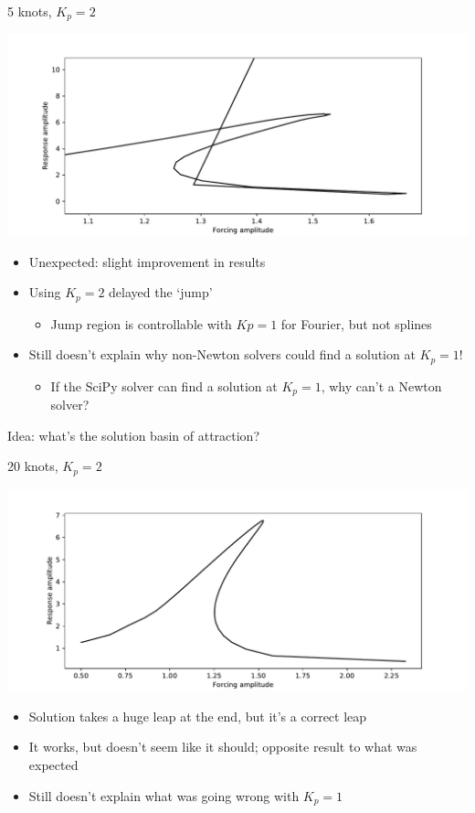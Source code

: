 \documentclass[presentation]{beamer}
\begin{document}
\begin{frame}[label={sec:org860db2f},plain]{5 knots, \(K_p = 2\)}
\begin{center}
\includegraphics[width=.9\linewidth]{./5_knots_cbc_kp_2.pdf}
\end{center}

\begin{itemize}
\item Unexpected: slight improvement in results
\item Using \(K_p = 2\) delayed the `jump'
\begin{itemize}
\item Jump region is controllable with \(Kp=1\) for Fourier, but not splines
\end{itemize}
\item \alert{Still doesn't explain why non-Newton solvers could find a solution at \(K_p=1\)!}
\begin{itemize}
\item If the SciPy solver can find a solution at \(K_p = 1\), why can't a Newton solver?
\end{itemize}
\end{itemize}
\vfill
Idea: what's the solution basin of attraction?
\end{frame}

\begin{frame}[label={sec:org727a869},plain]{20 knots, \(K_p = 2\)}
\begin{center}
\includegraphics[width=.9\linewidth]{./20_knots_kp_2.pdf}
\end{center}

\begin{itemize}
\item Solution takes a huge leap at the end, but it's a correct leap
\item It works, but doesn't seem like it should; opposite result to what was expected
\item \alert{Still doesn't explain what was going wrong with \(K_p = 1\)}
\end{itemize}
\end{frame}
\end{document}
